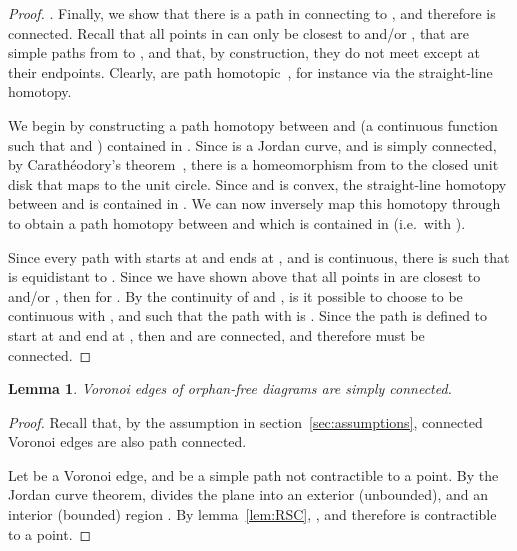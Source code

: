 \documentclass[11pt]{article}
\newtheorem{lemma}{Lemma}
\begin{document}
\begin{proof}
\vspace*{0.1in}\noindent{\bf [ is connected]}.
Finally, we show that there is a path in  connecting  to , 
	and therefore  is connected. 
Recall that all points in  can only be closest to  and/or , 
	that  are simple paths from  to , 
	and that, by construction, they do not meet except at their endpoints. 
Clearly,  are path homotopic~\cite[p.\ 323]{munkres2000topology}, 
	for instance via the straight-line homotopy. 



We begin by constructing a path homotopy  between  and 
	(a continuous function  
		such that  and )
	contained in . 
Since  is a Jordan curve, and  is simply connected, by Carath\'eodory's theorem~\cite{conformal}, 
	there is a homeomorphism  from  to the closed unit disk  that maps  to the unit circle. 
Since  and  is convex, the straight-line homotopy  
	between   and  is contained in . 
We can now inversely map this homotopy through  to obtain a path homotopy  
	between  and  which is contained in  
	(i.e.\  with ). 



Since every path  with  starts at  and ends at , 
	and  is continuous, there is  such that  is equidistant to . 
Since we have shown above that all points in  are closest to  and/or , 
	then  for . 
By the continuity of  and , is it possible to choose  to be continuous with , 
	and such that the path  
	with  is . 
Since the path  is defined to start at  and end at , then 
	 and  are connected, 
	and therefore  must be connected. 
\end{proof}


\begin{lemma}\label{lem:SCedges}
	Voronoi edges of orphan-free diagrams are simply connected. 
\end{lemma}

\begin{proof}

Recall that, by the assumption in section~\ref{sec:assumptions}, 
	connected Voronoi edges are also path connected.


Let  be a Voronoi edge, and  be a simple path not contractible to a point. 
By the Jordan curve theorem,  divides the plane into an exterior (unbounded), 
	and an interior (bounded) region . 
By lemma~\ref{lem:RSC}, , and therefore  is contractible to a point. 

\end{proof}
\end{document}
